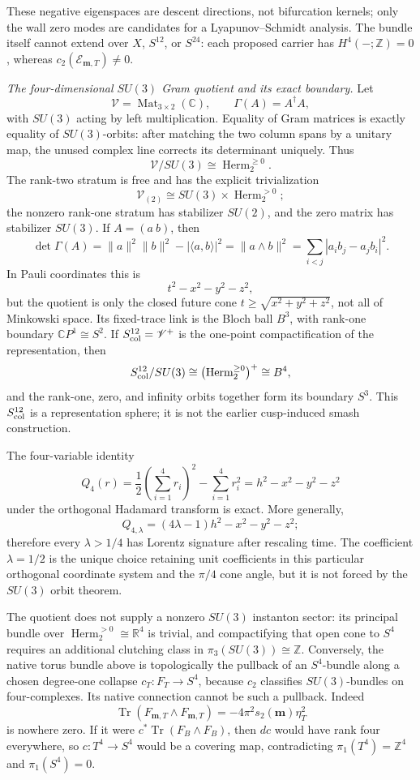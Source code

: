 \documentclass[10pt,letterpaper]{article}
\begin{document}
These negative eigenspaces are descent directions, not bifurcation kernels;
only the wall zero modes are candidates for a Lyapunov--Schmidt analysis.
The bundle itself cannot extend over \(X\), \(S^{12}\), or \(S^{24}\):
each proposed carrier has \(H^4(-;\mathbb Z)=0\), whereas
\(c_2(\mathscr E_{\mathbf m,T})\ne0\).

\medskip\noindent
\textit{The four-dimensional \(SU(3)\) Gram quotient and its exact
boundary.}
Let
\[
 \mathscr V=\operatorname{Mat}_{3\times2}(\mathbb C),\qquad
 \Gamma(A)=A^\dagger A,
\]
with \(SU(3)\) acting by left multiplication.  Equality of Gram matrices is
exactly equality of \(SU(3)\)-orbits: after matching the two column spans by
a unitary map, the unused complex line corrects its determinant uniquely.
Thus
\[
 \mathscr V/SU(3)\cong\operatorname{Herm}_2^{\ge0}.
\]
The rank-two stratum is free and has the explicit trivialization
\[
 \mathscr V_{(2)}
 \cong SU(3)\times\operatorname{Herm}_2^{>0};
\]
the nonzero rank-one stratum has stabilizer \(SU(2)\), and the zero matrix
has stabilizer \(SU(3)\).  If \(A=(a\ b)\), then
\[
 \det\Gamma(A)
 =\lVert a\rVert^2\lVert b\rVert^2-|\langle a,b\rangle|^2
 =\lVert a\wedge b\rVert^2
 =\sum_{i<j}|a_ib_j-a_jb_i|^2.
\]
In Pauli coordinates this is
\[
 t^2-x^2-y^2-z^2,
\]
but the quotient is only the closed future cone
\(t\ge\sqrt{x^2+y^2+z^2}\), not all of Minkowski space.  Its fixed-trace
link is the Bloch ball \(B^3\), with rank-one boundary
\(\mathbb CP^1\cong S^2\).  If
\(S^{12}_{\rm col}=\mathscr V^+\) is the one-point compactification of the
representation, then
\[
 S^{12}_{\rm col}/SU(3)
 \cong\bigl(\operatorname{Herm}_2^{\ge0}\bigr)^+
 \cong B^4,
\]
and the rank-one, zero, and infinity orbits together form its boundary
\(S^3\).  This \(S^{12}_{\rm col}\) is a representation sphere; it is not
the earlier cusp-induced smash construction.

The four-variable identity
\[
 Q_4(r)=\frac12\left(\sum_{i=1}^4r_i\right)^2-\sum_{i=1}^4r_i^2
       =h^2-x^2-y^2-z^2
\]
under the orthogonal Hadamard transform is exact.  More generally,
\[
 Q_{4,\lambda}=(4\lambda-1)h^2-x^2-y^2-z^2;
\]
therefore every \(\lambda>1/4\) has Lorentz signature after rescaling time.
The coefficient \(\lambda=1/2\) is the unique choice retaining unit
coefficients in this particular orthogonal coordinate system and the
\(\pi/4\) cone angle, but it is not forced by the \(SU(3)\) orbit theorem.

The quotient does not supply a nonzero \(SU(3)\) instanton sector: its
principal bundle over \(\operatorname{Herm}_2^{>0}\cong\mathbb R^4\) is
trivial, and compactifying that open cone to \(S^4\) requires an additional
clutching class in
\(\pi_3(SU(3))\cong\mathbb Z\).  Conversely, the native torus bundle above
is topologically the pullback of an \(S^4\)-bundle along a chosen
degree-one collapse \(c_T:F_T\to S^4\), because \(c_2\) classifies
\(SU(3)\)-bundles on four-complexes.  Its native connection cannot be such
a pullback.  Indeed
\[
 \operatorname{Tr}(F_{\mathbf m,T}\wedge F_{\mathbf m,T})
 =-4\pi^2s_2(\mathbf m)\eta_T^2
\]
is nowhere zero.  If it were \(c^*\operatorname{Tr}(F_B\wedge F_B)\),
then \(dc\) would have rank four everywhere, so \(c:T^4\to S^4\) would be a
covering map, contradicting
\(\pi_1(T^4)=\mathbb Z^4\) and \(\pi_1(S^4)=0\).
\end{document}
